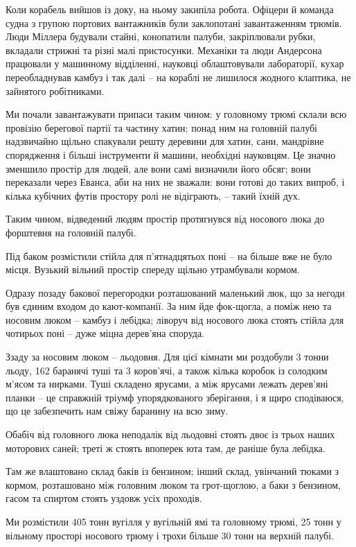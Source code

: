 Коли корабель вийшов із доку, на ньому закипіла робота. Офіцери й команда судна
з групою портових вантажників були заклопотані завантаженням трюмів. Люди
Міллера будували стайні, конопатили палуби, закріплювали рубки, вкладали
стрижні та різні малі пристосунки. Механіки та люди Андерсона працювали у
машинному відділенні, науковці облаштовували лабораторії, кухар переобладнував
камбуз і так далі – на кораблі не лишилося жодного клаптика, не зайнятого
робітниками.

Ми почали завантажувати припаси таким чином: у головному трюмі склали всю
провізію берегової партії та частину хатин; понад ним на головній палубі
надзвичайно щільно спакували решту деревини для хатин, сани, мандрівне
спорядження і більші інструменти й машини, необхідні науковцям. Це значно
зменшило простір для людей, але вони самі визначили його обсяг; вони переказали
через Еванса, аби на них не зважали: вони готові до таких випроб, і кілька
кубічних футів простору ролі не відіграють, – такий їхній дух.

Таким чином, відведений людям простір протягнувся від носового люка до форштевня на головній палубі.

Під баком розмістили стійла для п’ятнадцятьох поні – на більше вже не було
місця. Вузький вільний простір спереду щільно утрамбували кормом.

Одразу позаду бакової перегородки розташований маленький люк, що за негоди був єдиним входом до кают-компанії. За ним йде фок-щогла, а поміж нею та носовим люком – камбуз і лебідка; ліворуч від носового люка стоять стійла для чотирьох поні – дуже міцна дерев’яна споруда.

Ззаду за носовим люком – льодовня. Для цієї кімнати ми роздобули 3 тонни льоду,
162 баранячі туші та 3 коров’ячі, а також кілька коробок із солодким м’ясом та
нирками. Туші складено ярусами, а між ярусами лежать дерев’яні планки – це
справжній тріумф упорядкованого зберігання, і я щиро сподіваюся, що це
забезпечить нам свіжу баранину на всю зиму.

Обабіч від головного люка неподалік від льодовні стоять двоє із трьох наших моторових саней; треті ж стоять впоперек юта там, де раніше була лебідка.

Там же влаштовано склад баків із бензином; інший склад, увінчаний тюками з
кормом, розташовано між головним люком та грот-щоглою, а баки з бензином, гасом
та спиртом стоять уздовж усіх проходів.

Ми розмістили 405 тонн вугілля у вугільній ямі та головному трюмі, 25 тонн у
вільному просторі носового трюму і трохи більше 30 тонн на верхній палубі.

